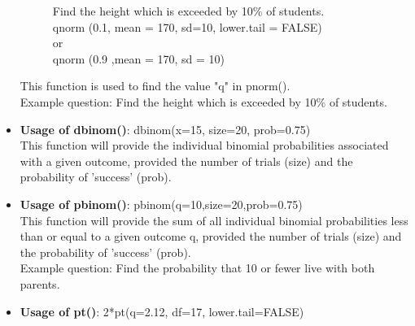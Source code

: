 \documentclass[12pt]{article}
\begin{document}
\begin{itemize}
\begin{figure} [H]
Find the height which is exceeded by 10\% of students.\\
qnorm (0.1, mean = 170, sd=10, lower.tail = FALSE)\\
or\\
qnorm (0.9 ,mean = 170, sd = 10)\\
\end{figure}
This function is used to find the value "q" in pnorm(). \\
Example question: Find the height which is exceeded by 10\% of students.

\item \textbf{Usage of dbinom()}: dbinom(x=15, size=20, prob=0.75) \\
This function will provide the individual binomial probabilities associated with a given outcome, provided the number of trials (size) and the probability of 'success' (prob).

\item \textbf{Usage of pbinom()}: pbinom(q=10,size=20,prob=0.75) \\
This function will provide the sum of all individual binomial probabilities less than or equal to a given outcome q, provided the number of trials (size) and the probability of 'success' (prob). \\
Example question: Find the probability that 10 or fewer live with both parents.

\item \textbf{Usage of pt()}: 2*pt(q=2.12, df=17, lower.tail=FALSE)

\begin{figure} [H]
\centering
{}
\end{figure}


\end{itemize}
\end{document}
